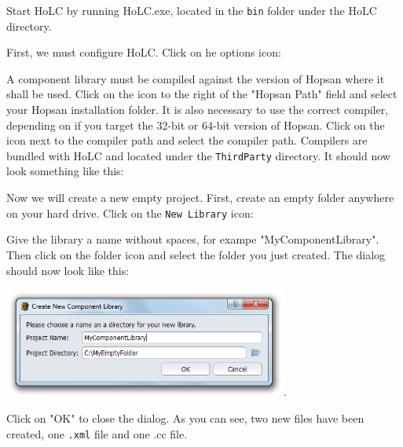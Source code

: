 \documentclass[a4paper,pdftex]{article}
\begin{document}
\begin{tutenumerate}
Start HoLC by running HoLC.exe, located in the \texttt{bin} folder under the HoLC directory.

First, we must configure HoLC. Click on he options icon:


A component library must be compiled against the version of Hopsan where it shall be used. 
Click on the icon to the right of the "Hopsan Path" field and select your Hopsan installation folder.
It is also necessary to use the correct compiler, depending on if you target the 32-bit or 64-bit version of Hopsan.
Click on the icon next to the compiler path and select the compiler path. 
Compilers are bundled with HoLC and located under the \texttt{ThirdParty} directory.
It should now look something like this:


Now we will create a new empty project. 
First, create an empty folder anywhere on your hard drive.
Click on the \texttt{New Library} icon:


Give the library a name without spaces, for exampe "MyComponentLibrary".
Then click on the folder icon and select the folder you just created.
The dialog should now look like this:

\includegraphics[width=0.7\textwidth]{gfx/writingcomponents/newlibrarydialog.png}.

Click on "OK" to close the dialog.
As you can see, two new files have been created, one \texttt{.xml} file and one .cc file.


\end{tutenumerate}
\end{document}
